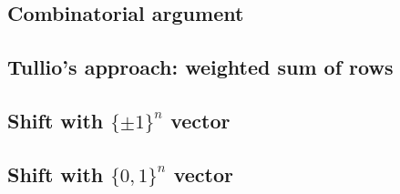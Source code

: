 \subsection{Combinatorial argument}
\label{sec:combinatorial_argument}


\subsection{Tullio's approach: weighted sum of rows}
\label{sec:tullio_approach_weighted_sum}


\subsection{Shift with $\{\pm 1\}^n$ vector}
\label{sec:shift_pm_one_vector}


\subsection{Shift with $\{0, 1\}^n$ vector}
\label{sec:shift_zero_one_vector}
